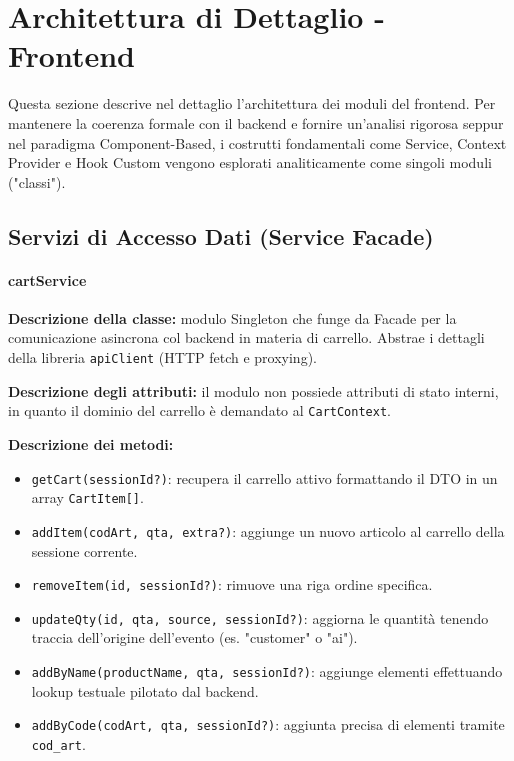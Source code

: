 \section{Architettura di Dettaglio - Frontend}

Questa sezione descrive nel dettaglio l'architettura dei moduli del frontend. Per mantenere la coerenza formale con il backend e fornire un'analisi rigorosa seppur nel paradigma Component-Based, i costrutti fondamentali come Service, Context Provider e Hook Custom vengono esplorati analiticamente come singoli moduli ("classi").

\subsection{Servizi di Accesso Dati (Service Facade)}

\paragraph{cartService}
\vspace{\baselineskip}\noindent\textbf{Descrizione della classe:} modulo Singleton che funge da Facade per la comunicazione asincrona col backend in materia di carrello. Abstrae i dettagli della libreria \texttt{apiClient} (HTTP fetch e proxying).

\vspace{\baselineskip}\noindent\textbf{Descrizione degli attributi:} il modulo non possiede attributi di stato interni, in quanto il dominio del carrello è demandato al \texttt{CartContext}.

\vspace{\baselineskip}\noindent\textbf{Descrizione dei metodi:}
\begin{itemize}
    \item \texttt{getCart(sessionId?)}: recupera il carrello attivo formattando il DTO in un array \texttt{CartItem[]}.
    \item \texttt{addItem(codArt, qta, extra?)}: aggiunge un nuovo articolo al carrello della sessione corrente.
    \item \texttt{removeItem(id, sessionId?)}: rimuove una riga ordine specifica.
    \item \texttt{updateQty(id, qta, source, sessionId?)}: aggiorna le quantità tenendo traccia dell'origine dell'evento (es. "customer" o "ai").
    \item \texttt{addByName(productName, qta, sessionId?)}: aggiunge elementi effettuando lookup testuale pilotato dal backend.
    \item \texttt{addByCode(codArt, qta, sessionId?)}: aggiunta precisa di elementi tramite \texttt{cod\_art}.
\end{itemize}

